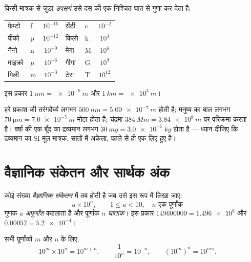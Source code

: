 \begin{definition}[SI उपसर्ग]\label{def:g10:orders-of-magnitude:prefixes}
किसी मात्रक से जुड़ा \emph{उपसर्ग} उसे दस की
एक निश्चित घात से गुणा कर देता है:
\begin{center}
\begin{tabular}{llc@{\qquad\qquad}llc}
फेम्टो & f & $10^{-15}$ & सेंटी & c & $10^{-2}$ \\
पीको  & p & $10^{-12}$ & किलो  & k & $10^{3}$  \\
नैनो  & n & $10^{-9}$  & मेगा  & M & $10^{6}$  \\
माइक्रो & $\mu$ & $10^{-6}$ & गीगा & G & $10^{9}$ \\
मिली & m & $10^{-3}$  & टेरा  & T & $10^{12}$ \\
\end{tabular}
\end{center}
इस प्रकार $\qty{1}{nm} = \qty{e-9}{m}$ और $\qty{1}{km} = \qty{e3}{m}$।
\end{definition}

\begin{example}[उपसर्ग पढ़ना]\label{ex:g10:orders-of-magnitude:prefixes}
हरे प्रकाश की तरंगदैर्घ्य लगभग $\qty{500}{nm} = \qty{5.00e-7}{m}$ होती है; मनुष्य का बाल लगभग
$\qty{70}{\micro m} = \qty{7.0e-5}{m}$ मोटा होता है; चंद्रमा $\qty{384}{Mm} = \qty{3.84e8}{m}$ पर परिक्रमा करता है। वर्षा की एक
बूँद का द्रव्यमान लगभग $\qty{30}{mg} = \qty{3.0e-5}{kg}$ होता है --- ध्यान दीजिए कि द्रव्यमान का
SI मूल मात्रक, सातों में अकेला, पहले से ही एक 
लिए हुए है।
\end{example}

\section{वैज्ञानिक संकेतन और सार्थक अंक}

\begin{definition}[वैज्ञानिक संकेतन]\label{def:g10:orders-of-magnitude:scinot}
कोई संख्या \emph{वैज्ञानिक संकेतन} में तब होती
है जब उसे इस रूप में लिखा जाए:
\[
a \times 10^{n}, \qquad 1 \leq a < 10, \quad n \text{ एक पूर्णांक}
\]
गुणक $a$ \emph{अपूर्णांश} कहलाता है और पूर्णांक
$n$ \emph{घातांक}। इस प्रकार $\num{149600000} = \num{1.496e8}$ और $\num{0.00052} = \num{5.2e-4}$।
\end{definition}

\begin{proposition}[दस की घातों के साथ गणना]\label{prop:g10:orders-of-magnitude:powers}
सभी पूर्णांकों $m$ और $n$ के लिए:
\[
10^{m} \times 10^{n} = 10^{m+n}, \qquad
\frac{1}{10^{n}} = 10^{-n}, \qquad
\left(10^{m}\right)^{n} = 10^{mn}.
\]
\end{proposition}

